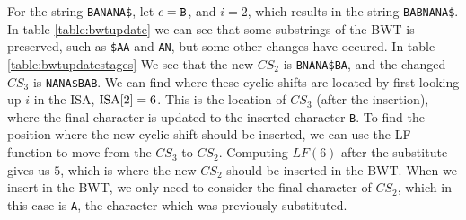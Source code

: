 \begin{table}[t]
	\begin{center}
        \hspace{1cm}
		\caption{BWT for string before and after insert}
		\label{table:bwtupdate}
	\end{center}
\end{table}

For the string \verb|BANANA$|, let $c = \verb|B|$, and $i = 2$, which results in the
string \verb|BABNANA$|. In table \ref{table:bwtupdate} we can see that some substrings of
the BWT is preserved, such as \verb|$AA| and \verb|AN|, but some other changes have
occured. In table \ref{table:bwtupdatestages} We see that the new $CS_2$ is
\verb|BNANA$BA|, and the changed $CS_3$ is \verb|NANA$BAB|. We can find where these
cyclic-shifts are located by first looking up $i$ in the ISA, $\mathrm{ISA}[{2}] = 6$. This is the
location of $CS_3$ (after the insertion), where the final character is updated to the
inserted character \verb|B|. To find the position where the new cyclic-shift should be
inserted, we can use the LF function to move from the $CS_3$ to $CS_2$. Computing
$LF(6)$ after the substitute gives us $5$, which is where the new $CS_2$ should be
inserted in the BWT. When we insert in the BWT, we only need to consider the final
character of $CS_2$, which in this case is \verb|A|, the character which was previously
substituted.


